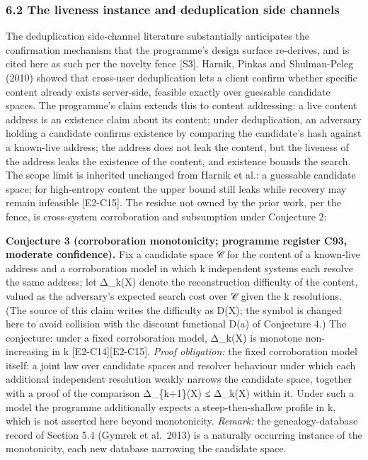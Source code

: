 \documentclass[
  11pt,
]{article}
\begin{document}
\subsubsection{6.2 The liveness instance and deduplication side
channels}\label{the-liveness-instance-and-deduplication-side-channels}

The deduplication side-channel literature substantially anticipates the
confirmation mechanism that the programme's design surface re-derives,
and is cited here as such per the novelty fence {[}S3{]}. Harnik, Pinkas
and Shulman-Peleg (2010) showed that cross-user deduplication lets a
client confirm whether specific content already exists server-side,
feasible exactly over guessable candidate spaces. The programme's claim
extends this to content addressing: a live content address is an
existence claim about its content; under deduplication, an adversary
holding a candidate confirms existence by comparing the candidate's hash
against a known-live address; the address does not leak the content, but
the liveness of the address leaks the existence of the content, and
existence bounds the search. The scope limit is inherited unchanged from
Harnik et al.: a guessable candidate space; for high-entropy content the
upper bound still leaks while recovery may remain infeasible
{[}E2-C15{]}. The residue not owned by the prior work, per the fence, is
cross-system corroboration and subsumption under Conjecture 2:

\textbf{Conjecture 3 (corroboration monotonicity; programme register
C93, moderate confidence).} Fix a candidate space 𝒞 for the content of a
known-live address and a corroboration model in which k independent
systems each resolve the same address; let Δ\_k(X) denote the
reconstruction difficulty of the content, valued as the adversary's
expected search cost over 𝒞 given the k resolutions. (The source of this
claim writes the difficulty as D(X); the symbol is changed here to avoid
collision with the discount functional D(a) of Conjecture 4.) The
conjecture: under a fixed corroboration model, Δ\_k(X) is monotone
non-increasing in k {[}E2-C14{]}{[}E2-C15{]}. \emph{Proof obligation:}
the fixed corroboration model itself: a joint law over candidate spaces
and resolver behaviour under which each additional independent
resolution weakly narrows the candidate space, together with a proof of
the comparison Δ\_\{k+1\}(X) ≤ Δ\_k(X) within it. Under such a model the
programme additionally expects a steep-then-shallow profile in k, which
is not asserted here beyond monotonicity. \emph{Remark:} the
genealogy-database record of Section 5.4 (Gymrek et al.~2013) is a
naturally occurring instance of the monotonicity, each new database
narrowing the candidate space.
\end{document}
